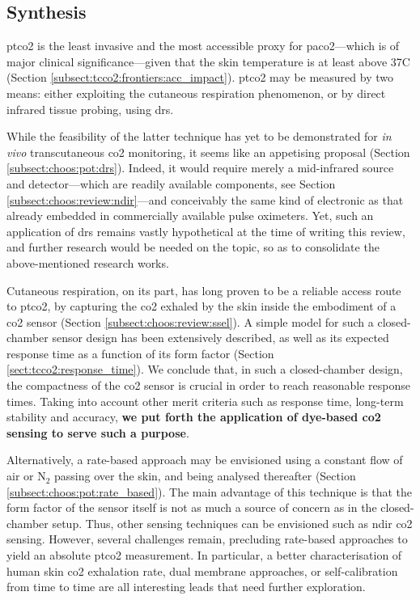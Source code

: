 \subsection{Synthesis}

\gls{ptco2} is the least invasive and the most accessible proxy for \gls{paco2}---which is of major clinical significance---given that the skin temperature is at least above 37{\degree}C (Section \ref{subsect:tcco2:frontiers:acc_impact}). \gls{ptco2} may be measured by two means: either exploiting the cutaneous respiration phenomenon, or by direct infrared tissue probing, using \gls{drs}.

While the feasibility of the latter technique has yet to be demonstrated for \emph{in vivo} transcutaneous \gls{co2} monitoring, it seems like an appetising proposal (Section \ref{subsect:choos:pot:drs}). Indeed, it would require merely a mid-infrared source and detector---which are readily available components, see Section \ref{subsect:choos:review:ndir}---and conceivably the same kind of electronic as that already embedded in commercially available pulse oximeters. Yet, such an application of \gls{drs} remains vastly hypothetical at the time of writing this review, and \mfrin{}further research would be needed on the topic, so as to consolidate the above-mentioned research works.

Cutaneous respiration, on its part, has long proven to be a reliable access route to \gls{ptco2}, by capturing the \gls{co2} exhaled by the skin inside the embodiment of a \gls{co2} sensor (Section \ref{subsect:choos:review:ssel}). A simple model for such a closed-chamber sensor design has been extensively described, as well as its expected response time as a function of its form factor (Section \ref{sect:tcco2:response_time}). We conclude that, in such a closed-chamber design, the compactness of the \gls{co2} sensor is crucial in order to reach reasonable response times. Taking into account other merit criteria such as response time, long-term stability and accuracy, \textbf{we put forth the application of dye-based \gls{co2} sensing to serve such a purpose}.

Alternatively, a rate-based approach may be envisioned using a constant flow of air or N$_2$ passing over the skin, and being analysed thereafter (Section \ref{subsect:choos:pot:rate_based}). The main advantage of this technique is that the form factor of the sensor itself is not as much a source of concern as in the closed-chamber setup. Thus, other sensing techniques can be envisioned such as \gls{ndir} \gls{co2} sensing. However, several challenges remain, precluding rate-based approaches to yield an absolute \gls{ptco2} measurement. In particular, a better characterisation of human skin \gls{co2} exhalation rate, dual membrane approaches, or self-calibration from time to time are all interesting leads that need further exploration.

